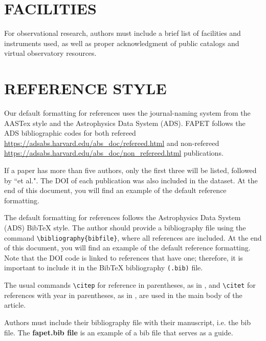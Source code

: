 \documentclass[9pt,article,twoside]{fapet-rho-class/fapet-rho}
\newcommand{\CS}[1]{\texttt{\textbackslash #1}}
\begin{document}

\section{FACILITIES}

For observational research, authors must include a brief list of facilities and instruments used, as well as proper acknowledgment of public catalogs and virtual observatory resources.

\section{REFERENCE STYLE}

    Our default formatting for references uses the journal-naming system from the AASTex style and the Astrophysics Data System (ADS). FAPET follows the ADS bibliographic codes for both refereed \url{https://adsabs.harvard.edu/abs_doc/refereed.html} and non-refereed \url{https://adsabs.harvard.edu/abs_doc/non_refereed.html} publications.
    
    If a paper has more than five authors, only the first three will be listed, followed by ``et al.". The DOI of each publication was also included in the dataset. At the end of this document, you will find an example of the default reference formatting. 

    The default formatting for references follows the Astrophysics Data System (ADS) BibTeX style. The author should provide a bibliography file using the command \CS{bibliography}\verb|{bibfile}|, where all references are included. At the end of this document, you will find an example of the default reference formatting. Note that the DOI code is linked to references that have one; therefore, it is important to include it in the BibTeX bibliography \texttt{(.bib)} file.
    
    The usual commands \CS{citep} for reference in parentheses, as in \citep{Roman23},  and \CS{citet} for references with year in parentheses, as in \citet{Roman23}, are used in the main body of the article.

    Authors must include their bibliography file with their manuscript, i.e. the 
    bib file. The {\bf fapet.bib file} is an example of a bib file that serves as a guide.

\renewcommand{\refname}{REFERENCES}


\end{document}
